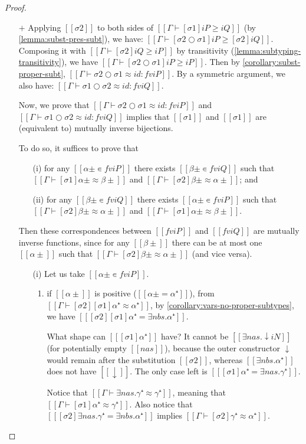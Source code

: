 \lemmaMutualSubstSubtyping*
\begin{proof}
  \hfill
  \begin{itemize}
  \item[$+$]
    Applying $[[σ2]]$ to both sides of
    $[[Γ ⊢ [σ1] iP ≥ iQ]]$ (by \cref{lemma:subst-pres-subt}),
    we have: $[[Γ ⊢ [σ2 ○ σ1] iP ≥ [σ2]iQ]]$.
    Composing it with $[[Γ ⊢ [σ2] iQ ≥ iP]]$ by transitivity 
    (\cref{lemma:subtyping-transitivity}),
    we have $[[Γ ⊢ [σ2 ○ σ1] iP ≥ iP]]$.
    Then by \cref{corollary:subst-proper-subt},
    $[[Γ ⊢ σ2 ○ σ1 ≈ id :  fv iP]]$.
    By a symmetric argument, we also have:
    $[[Γ ⊢ σ1 ○ σ2 ≈ id :  fv iQ]]$.

    Now, we prove that
    $[[Γ ⊢ σ2 ○ σ1 ≈ id :  fv iP]]$ and
    $[[Γ ⊢ σ1 ○ σ2 ≈ id :  fv iQ]]$
    implies that $[[σ1]]$ and $[[σ1]]$
    are (equivalent to) mutually inverse bijections.

    To do so, it suffices to prove that
    \begin{enumerate}
    \item[(i)] for any $[[α± ∊ fv iP]]$ there exists $[[β± ∊ fv iQ]]$
        such that $[[ Γ ⊢ [σ1] α± ≈ β± ]]$ and
        $[[ Γ ⊢ [σ2] β± ≈ α± ]]$; and
    \item[(ii)] for any $[[β± ∊ fv iQ]]$ there exists $[[α± ∊ fv iP]]$
        such that $[[ Γ ⊢ [σ2] β± ≈ α± ]]$ and
        $[[ Γ ⊢ [σ1] α± ≈ β± ]]$.
    \end{enumerate}
    Then these correspondences between $[[fv iP]]$ and
    $[[fv iQ]]$ are mutually inverse functions,
    since for any $[[β±]]$ there can be at most one $[[α±]]$
    such that $[[ Γ ⊢ [σ2] β± ≈ α± ]]$ (and vice versa).

    \begin{enumerate}
    \item[(i)] Let us take $[[α± ∊ fv iP]]$.
      \begin{enumerate}
      \item if $[[α±]]$ is positive ($[[α± = α⁺]]$),
        from $[[ Γ ⊢ [σ2][σ1]α⁺ ≈ α⁺ ]]$,
        by \cref{corollary:vars-no-proper-subtypes},
        we have
        $[[ [σ2][σ1]α⁺ = ∃nbs.α⁺ ]]$.

        What shape can $[[ [σ1]α⁺ ]]$ have? It cannot be $[[∃nas.↓iN]]$ (for
        potentially empty $[[nas]]$), because the outer constructor $\downarrow$
        would remain after the substitution $[[σ2]]$, whereas $[[∃nbs.α⁺]]$ does
        not have $[[↓]]$. The only case left is $[[ [σ1]α⁺ = ∃nas.γ⁺ ]]$.

        Notice that $[[Γ ⊢ ∃nas.γ⁺ ≈ γ⁺]]$, meaning that $[[Γ ⊢ [σ1]α⁺ ≈ γ⁺]]$.
        Also notice that $[[ [σ2]∃nas.γ⁺ = ∃nbs.α⁺ ]]$ implies
        $[[Γ ⊢ [σ2]γ⁺ ≈ α⁺]]$.


\end{enumerate}
\end{enumerate}
\end{itemize}
\end{proof}
